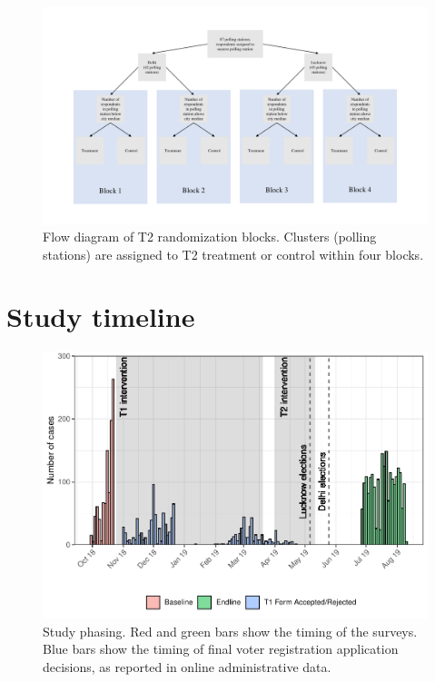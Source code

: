 \documentclass[
  11.5pt,
]{article}
\begin{document}
\begin{figure}

{\centering \includegraphics[width=1\linewidth]{pic-t2-block-design} 

}

\caption{Flow diagram of T2 randomization blocks. Clusters (polling stations) are assigned to T2 treatment or control within four blocks.}\label{fig:unnamed-chunk-36}
\end{figure}

\clearpage

\section{Study timeline}

\begin{figure}
\centering
\includegraphics{supplementary-information_files/figure-latex/unnamed-chunk-37-1.pdf}
\caption{Study phasing. Red and green bars show the timing of the
surveys. Blue bars show the timing of final voter registration
application decisions, as reported in online administrative data.}
\end{figure}
\end{document}
